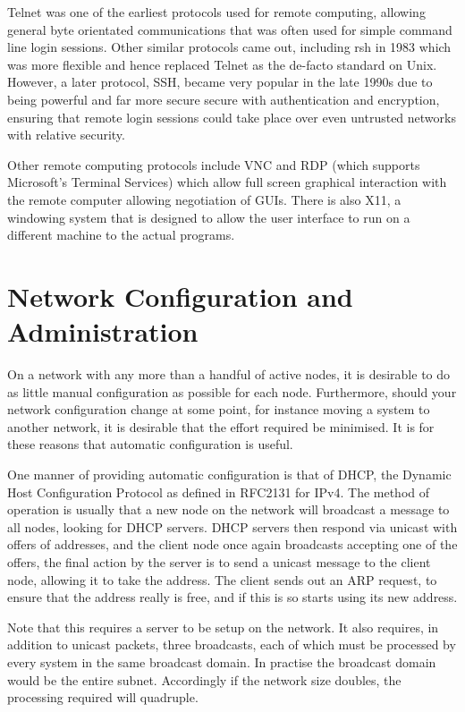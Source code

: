 \documentclass[a4paper,12pt]{article}
\begin{document}
Telnet was one of the earliest protocols used for remote computing, 
allowing general byte orientated communications that was often used for 
simple command line login sessions. Other similar protocols came out, 
including rsh in 1983 which was more flexible and hence replaced Telnet 
as the de-facto standard on Unix. However, a later protocol, SSH, became 
very popular in the late 1990s due to being powerful and far more secure 
secure with authentication and encryption, ensuring that remote login 
sessions could take place over even untrusted networks with relative 
security. 


Other remote computing protocols include VNC and RDP (which supports 
Microsoft's Terminal Services) which allow full screen graphical 
interaction with the remote computer allowing negotiation of GUIs. 
There is also X11, a windowing system that is designed to allow the 
user interface to run on a different machine to the actual programs.

\section{Network Configuration and Administration}

On a network with any more than a handful of active nodes, it is desirable to
do as little manual configuration as possible for each node. Furthermore,
should your network configuration change at some point, for instance moving a
system to another network, it is desirable that the effort required be
minimised. It is for these reasons that automatic configuration is useful.


One manner of providing automatic configuration is that of DHCP, the Dynamic
Host Configuration Protocol as defined in RFC2131 for IPv4. The method of
operation is usually that a new node on the network will broadcast a message to
all nodes, looking for DHCP servers. DHCP servers then respond via unicast with
offers of addresses, and the client node once again broadcasts accepting one of
the offers, the final action by the server is to send a unicast message to the
client node, allowing it to take the address. The client sends out an ARP
request, to ensure that the address really is free, and if this is so starts
using its new address.


Note that this requires a server to be setup on the network. It also requires,
in addition to unicast packets, three broadcasts, each of which must be
processed by every system in the same broadcast domain. In practise the
broadcast domain would be the entire subnet. Accordingly if the network size
doubles, the processing required will quadruple.
\end{document}
